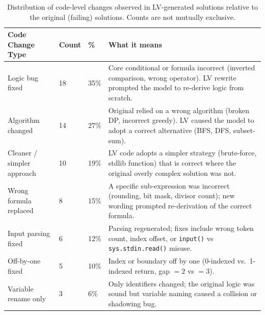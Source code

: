 \documentclass{article}
\begin{document}
\begin{table}[ht]
\centering
\caption{Distribution of code-level changes observed in LV-generated solutions relative to the original (failing) solutions. Counts are not mutually exclusive.}
\label{tab:code-changes}
\begin{tabular}{p{4.8cm}p{1.0cm}p{1.0cm}p{7.6cm}}
\toprule
\textbf{Code Change Type} & \textbf{Count} & \textbf{\%} & \textbf{What it means} \\
\midrule

\rowcolor[RGB]{220,235,255}
Logic bug fixed & 18 & 35\% &
Core conditional or formula incorrect (inverted comparison, wrong operator). LV rewrite prompted the model to re-derive logic from scratch. \\
\addlinespace[2pt]

\rowcolor[RGB]{220,255,220}
Algorithm changed & 14 & 27\% &
Original relied on a wrong algorithm (broken DP, incorrect greedy). LV caused the model to adopt a correct alternative (BFS, DFS, subset-sum). \\
\addlinespace[2pt]

\rowcolor[RGB]{240,230,255}
Cleaner / simpler approach & 10 & 19\% &
LV code adopts a simpler strategy (brute-force, stdlib function) that is correct where the original overly complex solution was not. \\
\addlinespace[2pt]

\rowcolor[RGB]{255,240,200}
Wrong formula replaced & 8 & 15\% &
A specific sub-expression was incorrect (rounding, bit mask, divisor count); new wording prompted re-derivation of the correct formula. \\
\addlinespace[2pt]

\rowcolor[RGB]{255,225,210}
Input parsing fixed & 6 & 12\% &
Parsing regenerated; fixes include wrong token count, index offset, or \texttt{input()} vs \texttt{sys.stdin.read()} misuse. \\
\addlinespace[2pt]

\rowcolor[RGB]{255,245,200}
Off-by-one fixed & 5 & 10\% &
Index or boundary off by one (0-indexed vs.\ 1-indexed return, gap $=2$ vs $=3$). \\
\addlinespace[2pt]

\rowcolor[RGB]{230,230,230}
Variable rename only & 3 & 6\% &
Only identifiers changed; the original logic was sound but variable naming caused a collision or shadowing bug. \\

\bottomrule
\end{tabular}
\end{table}
\end{document}
